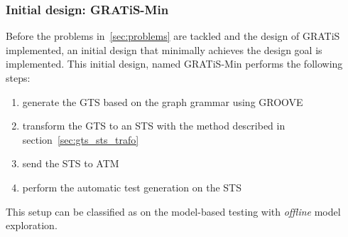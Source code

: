 \subsubsection{Initial design: GRATiS-Min}\label{sec:init_design}
Before the problems in~\ref{sec:problems} are tackled and the design of GRATiS implemented, an initial design that minimally achieves the design goal is implemented. This initial design, named GRATiS-Min performs the following steps:
\begin{enumerate}
  \item generate the GTS based on the graph grammar using GROOVE
  \item transform the GTS to an STS with the method described in section~\ref{sec:gts_sts_trafo}
  \item send the STS to ATM
  \item perform the automatic test generation on the STS
\end{enumerate}
This setup can be classified as on the model-based testing with \textit{offline} model exploration.

